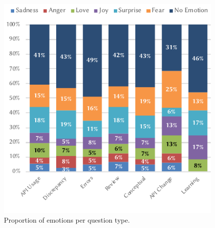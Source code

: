 \begin{figure}[tbh]
\centering
\includegraphics[width=.6\linewidth]{emotionproportion}
\caption[Proportion of emotions per question type]{Proportion of emotions per question type.}
\label{semotion2020:fig:emotion-dist}
\end{figure}

